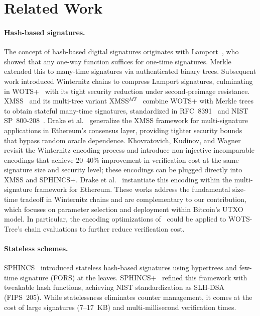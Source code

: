 \documentclass[11pt,a4paper]{article}
\theoremstyle{definition}
\begin{document}
\section{Related Work}
\label{sec:related}

\paragraph{Hash-based signatures.} The concept of hash-based digital signatures originates with Lamport~\cite{lamport1979constructing}, who showed that any one-way function suffices for one-time signatures. Merkle~\cite{merkle1989certified} extended this to many-time signatures via authenticated binary trees. Subsequent work introduced Winternitz chains to compress Lamport signatures, culminating in WOTS+~\cite{hulsing2013wots} with its tight security reduction under second-preimage resistance. XMSS~\cite{buchmann2011xmss} and its multi-tree variant XMSS$^{MT}$~\cite{rfc8391} combine WOTS+ with Merkle trees to obtain stateful many-time signatures, standardized in RFC~8391~\cite{rfc8391} and NIST SP~800-208~\cite{nist2020sp800208}. Drake et al.~\cite{drake2025multisig} generalize the XMSS framework for multi-signature applications in Ethereum's consensus layer, providing tighter security bounds that bypass random oracle dependence. Khovratovich, Kudinov, and Wagner~\cite{khovratovich2025hypercube} revisit the Winternitz encoding process and introduce non-injective incomparable encodings that achieve 20--40\% improvement in verification cost at the same signature size and security level; these encodings can be plugged directly into XMSS and SPHINCS+. Drake et al.~\cite{drake2025leansig} instantiate this encoding within the multi-signature framework for Ethereum. These works address the fundamental size-time tradeoff in Winternitz chains and are complementary to our contribution, which focuses on parameter selection and deployment within Bitcoin's UTXO model. In particular, the encoding optimizations of~\cite{khovratovich2025hypercube} could be applied to WOTS-Tree's chain evaluations to further reduce verification cost.

\paragraph{Stateless schemes.} SPHINCS~\cite{bernstein2015sphincs} introduced stateless hash-based signatures using hypertrees and few-time signature (FORS) at the leaves. SPHINCS+~\cite{bernstein2019sphincs} refined this framework with tweakable hash functions, achieving NIST standardization as SLH-DSA~\cite{nist2024slhdsa} (FIPS~205). While statelessness eliminates counter management, it comes at the cost of large signatures (7--17~KB) and multi-millisecond verification times.
\end{document}
